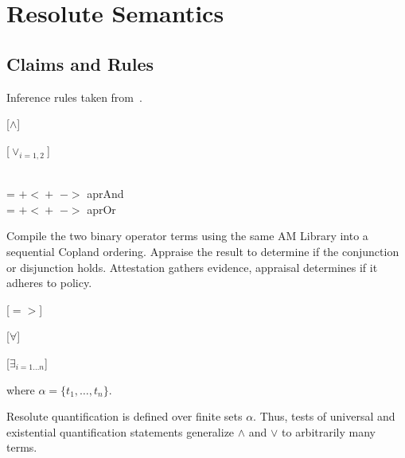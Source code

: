 \section{Resolute Semantics}

\subsection{Claims and Rules}

Inference rules taken from~\citet{gacek2014resolute}.

[$\wedge$]

[$\vee_{i=1,2}$]

\begin{definition} \\
   =  $\mathsf{+\!<\!+}$
   $->$ aprAnd \\
   =  $\mathsf{+\!<\!+}$
   $->$ aprOr
\end{definition}

Compile the two binary operator terms using the same AM Library into a
sequential Copland ordering.  Appraise the result to determine if the
conjunction or disjunction holds.  Attestation gathers evidence,
appraisal determines if it adheres to policy.

[$=>$]

\begin{definition}[Implication]
  
\end{definition}

\begin{minipage}{0.45\linewidth}
 [$\forall$]
\end{minipage}
\begin{minipage}{0.45\linewidth}
  [$\exists_{i=1\ldots n}$]
\end{minipage}

where $\alpha=\{t_1,\ldots,t_n\}$.

Resolute quantification is defined over finite sets $\alpha$. Thus,
tests of universal and existential quantification statements
generalize $\wedge$ and $\vee$ to arbitrarily many terms.

